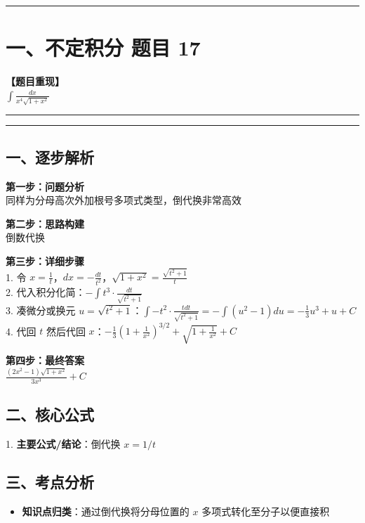 ﻿\documentclass[12pt, a4paper]{ctexart}
\newcommand{\TopSeparator}{
    \par\noindent\rule{\textwidth}{1.5pt}\vspace{0.5em}
}
\newcommand{\AnalysisSeparator}{
    \par\noindent\rule{\textwidth}{0.5pt}\vspace{0.2em}\hrule\vspace{0.5em}
}
\newenvironment{RedAnalysis}{
    \par
    \color{red} 
}{
    \par
    \color{black} 
}
\begin{document}
\vspace{2em}

\TopSeparator
\section*{一、不定积分 题目 17}

\textbf{【题目重现】} \\
$\int \frac{dx}{x^4\sqrt{1+x^2}}$

\AnalysisSeparator

\begin{RedAnalysis}

	\subsection*{一、逐步解析}

	\textbf{第一步：问题分析} \\
	同样为分母高次外加根号多项式类型，倒代换非常高效

	\textbf{第二步：思路构建} \\
	倒数代换

	\textbf{第三步：详细步骤} \\
	1. 令 $x = \frac{1}{t}$，$dx = -\frac{dt}{t^2}$，$\sqrt{1+x^2}=\frac{\sqrt{t^2+1}}{t}$ \\ 
	2. 代入积分化简：$-\int t^3 \cdot \frac{dt}{\sqrt{t^2+1}}$ \\ 
	3. 凑微分或换元 $u = \sqrt{t^2+1}$：$\int -t^2 \cdot \frac{t dt}{\sqrt{t^2+1}} = -\int (u^2-1) du = - \frac{1}{3}u^3 + u + C$ \\ 
	4. 代回 $t$ 然后代回 $x$：$- \frac{1}{3}(1+\frac{1}{x^2})^{3/2} + \sqrt{1+\frac{1}{x^2}} + C$

	\textbf{第四步：最终答案} \\
	$\frac{(2x^2-1)\sqrt{1+x^2}}{3x^3} + C$

	\subsection*{二、核心公式}
	1. \textbf{主要公式/结论}：$\text{倒代换 } x=1/t$

	\subsection*{三、考点分析}
	\begin{itemize}
		\item \textbf{知识点归类}：通过倒代换将分母位置的 $x$ 多项式转化至分子以便直接积
	\end{itemize}

\end{RedAnalysis}
\end{document}
